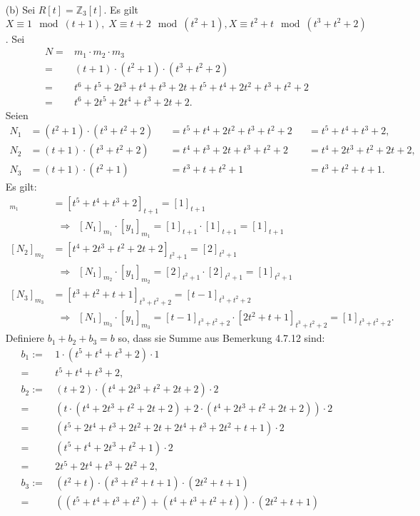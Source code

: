 \documentclass[12pt]{article}
\newcommand{\df}{\enspace\Longrightarrow\enspace}
\begin{document}
\begin{enumerate}
	\item[(b)] Sei $R[t]=\mathbb{Z}_3[t]$. Es gilt $X\equiv1\mod(t+1),\;X\equiv t+2\mod(t^2+1),X\equiv t^2+t\mod(t^3+t^2+2)$. Sei
	\begin{align*}
		N=&m_1\cdot m_2\cdot m_3 \\
		=&(t+1)\cdot(t^2+1)\cdot(t^3+t^2+2) \\
		=&t^6+t^5+2t^3+t^4+t^3+2t+t^5+t^4+2t^2+t^3+t^2+2 \\
		=&t^6+2t^5+2t^4+t^3+2t+2.
	\end{align*}
	Seien
	\begin{align*}
		N_1&=(t^2+1)\cdot(t^3+t^2+2) & &=t^5+t^4+2t^2+t^3+t^2+2 & &=t^5+t^4+t^3+2, \\
		N_2&=(t+1)\cdot(t^3+t^2+2) & &=t^4+t^3+2t+t^3+t^2+2 & &=t^4+2t^3+t^2+2t+2, \\
		N_3&=(t+1)\cdot(t^2+1) & &=t^3+t+t^2+1 & &=t^3+t^2+t+1.
	\end{align*}
	Es gilt:
	\begin{align*}
		[N_1]_{m_1}&=[t^5+t^4+t^3+2]_{t+1}=[1]_{t+1} \\
		&\df[N_1]_{m_1}\cdot[y_1]_{m_1}=[1]_{t+1}\cdot[1]_{t+1}=[1]_{t+1} \\
		[N_2]_{m_2}&=[t^4+2t^3+t^2+2t+2]_{t^2+1}=[2]_{t^2+1} \\
		&\df[N_1]_{m_2}\cdot[y_1]_{m_2}=[2]_{t^2+1}\cdot[2]_{t^2+1}=[1]_{t^2+1} \\
		[N_3]_{m_3}&=[t^3+t^2+t+1]_{t^3+t^2+2}=[t-1]_{t^3+t^2+2} \\
		&\df[N_1]_{m_3}\cdot[y_1]_{m_3}=[t-1]_{t^3+t^2+2}\cdot[2t^2+t+1]_{t^3+t^2+2}=[1]_{t^3+t^2+2}.
	\end{align*}
	Definiere $b_1+b_2+b_3=b$ so, dass sie Summe aus Bemerkung 4.7.12 sind:
	\begin{align*}
		b_1:=&\,1\cdot(t^5+t^4+t^3+2)\cdot1 \\
		=&\,t^5+t^4+t^3+2, \\
		b_2:=&\,(t+2)\cdot(t^4+2t^3+t^2+2t+2)\cdot2 \\
		=&\,(t\cdot(t^4+2t^3+t^2+2t+2)+2\cdot(t^4+2t^3+t^2+2t+2))\cdot2 \\
		=&\,(t^5+2t^4+t^3+2t^2+2t+2t^4+t^3+2t^2+t+1)\cdot2 \\
		=&\,(t^5+t^4+2t^3+t^2+1)\cdot2 \\
		=&\,2t^5+2t^4+t^3+2t^2+2, \\
		b_3:=&\,(t^2+t)\cdot(t^3+t^2+t+1)\cdot(2t^2+t+1) \\
		=&\,((t^5+t^4+t^3+t^2)+(t^4+t^3+t^2+t))\cdot(2t^2+t+1) \\

\end{align*}
\end{enumerate}
\end{document}
